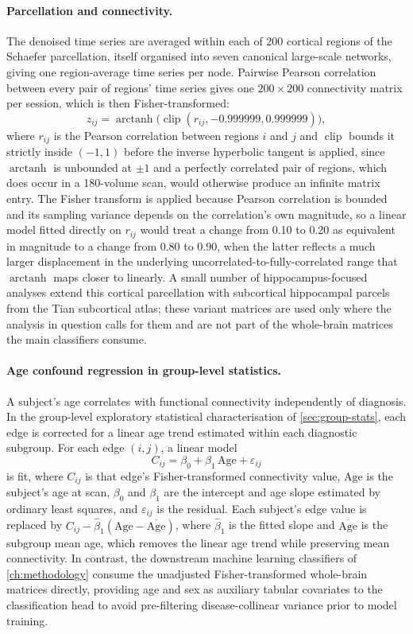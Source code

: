 \paragraph{Parcellation and connectivity.} The denoised time series are averaged within
each of 200 cortical regions of the Schaefer parcellation, itself organised into seven
canonical large-scale networks, giving one region-average time series per node. Pairwise
Pearson correlation between every pair of regions' time series gives one
$200 \times 200$ connectivity matrix per session, which is then Fisher-transformed:
\[
  z_{ij} = \operatorname{arctanh}\bigl(\operatorname{clip}(r_{ij}, -0.999999, 0.999999)\bigr),
\]
where $r_{ij}$ is the Pearson correlation between regions $i$ and $j$ and
$\operatorname{clip}$ bounds it strictly inside $(-1, 1)$ before the inverse hyperbolic
tangent is applied, since $\operatorname{arctanh}$ is unbounded at $\pm 1$ and a
perfectly correlated pair of regions, which does occur in a 180-volume scan, would
otherwise produce an infinite matrix entry. The Fisher transform is applied because Pearson
correlation is bounded and its sampling variance depends on the correlation's own
magnitude, so a linear model fitted directly on $r_{ij}$ would treat a change from 0.10 to
0.20 as equivalent in magnitude to a change from 0.80 to 0.90, when the latter reflects a
much larger displacement in the underlying uncorrelated-to-fully-correlated range that
$\operatorname{arctanh}$ maps closer to linearly. A small number of hippocampus-focused
analyses extend this cortical parcellation with subcortical hippocampal parcels from the
Tian subcortical atlas; these variant matrices are used only where the analysis in question
calls for them and are not part of the whole-brain matrices the main classifiers consume.

\paragraph{Age confound regression in group-level statistics.} A subject's age correlates with
functional connectivity independently of diagnosis. In the group-level exploratory statistical
characterisation of \autoref{sec:group-stats}, each edge is corrected for a linear age trend
estimated within each diagnostic subgroup. For each edge $(i,j)$, a linear model
\[
  C_{ij} = \beta_0 + \beta_1 \, \text{Age} + \varepsilon_{ij}
\]
is fit, where $C_{ij}$ is that edge's Fisher-transformed connectivity value, $\text{Age}$ is the
subject's age at scan, $\beta_0$ and $\beta_1$ are the intercept and age slope estimated by ordinary
least squares, and $\varepsilon_{ij}$ is the residual. Each subject's edge value is replaced by
$C_{ij} - \hat\beta_1 (\text{Age} - \overline{\text{Age}})$, where $\hat\beta_1$ is the fitted slope
and $\overline{\text{Age}}$ is the subgroup mean age, which removes the linear age trend while
preserving mean connectivity. In contrast, the downstream machine learning classifiers of
\autoref{ch:methodology} consume the unadjusted Fisher-transformed whole-brain matrices directly,
providing age and sex as auxiliary tabular covariates to the classification head to avoid
pre-filtering disease-collinear variance prior to model training.

